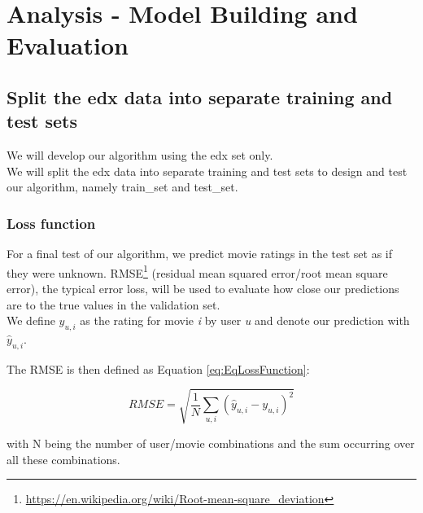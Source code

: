 \documentclass[
]{article}
\DeclareRobustCommand{\href}[2]{#2\footnote{\url{#1}}}
\begin{document}
\newpage

\hypertarget{analysis---model-building-and-evaluation}{%
\section{Analysis - Model Building and
Evaluation}\label{analysis---model-building-and-evaluation}}

\hypertarget{split-the-edx-data-into-separate-training-and-test-sets}{%
\subsection{Split the edx data into separate training and test
sets}\label{split-the-edx-data-into-separate-training-and-test-sets}}

We will develop our algorithm using the edx set only.\\
We will split the edx data into separate training and test sets to
design and test our algorithm, namely train\_set and test\_set.

\hypertarget{loss-function}{%
\subsubsection{Loss function}\label{loss-function}}

For a final test of our algorithm, we predict movie ratings in the test
set as if they were unknown.
\href{https://en.wikipedia.org/wiki/Root-mean-square_deviation}{RMSE}
(residual mean squared error/root mean square error), the typical error
loss, will be used to evaluate how close our predictions are to the true
values in the validation set.\\
We define \({y_{u,i}}\) as the rating for movie \emph{i} by user
\emph{u} and denote our prediction with \({\hat{y}_{u,i}}\).

The RMSE is then defined as Equation \ref{eq:EqLossFunction}:

%
\par

\label{eq:EqLossFunction} \begin{equation}
  RMSE=\sqrt{\frac{1}{N}\sum_{u,i}(\hat{y}_{u,i}-y_{u,i})^{2}}
\end{equation}

with N being the number of user/movie combinations and the sum occurring
over all these combinations.
\end{document}
